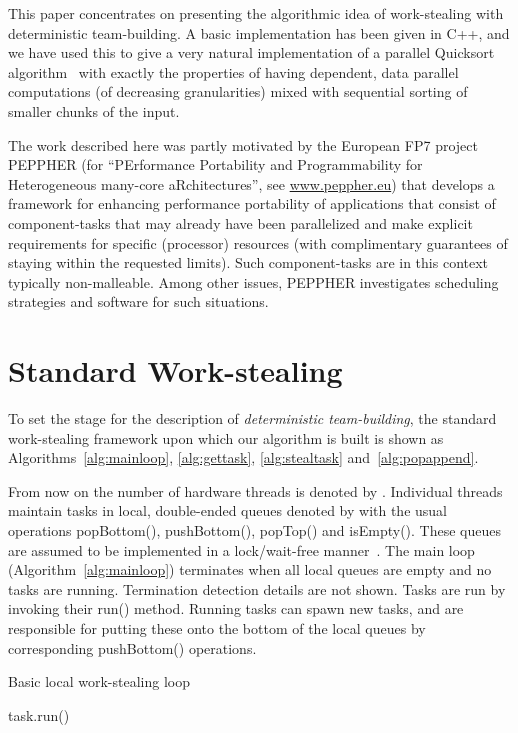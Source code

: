 \documentclass[preprint]{sigplanconf}
\begin{document}
This paper concentrates on presenting the algorithmic idea of
work-stealing with deterministic team-building. A basic implementation
has been given in C++, and we have used this to give a very natural
implementation of a parallel Quicksort
algorithm~\cite{TsigasZhang03} with exactly the properties of having
dependent, data parallel computations (of decreasing granularities)
mixed with sequential sorting of smaller chunks of the input.

The work described here was partly motivated by the European FP7
project PEPPHER (for ``PErformance Portability and Programmability for
Heterogeneous many-core aRchitectures'', see \url{www.peppher.eu})
that develops a framework for enhancing performance portability of
applications that consist of component-tasks that may already have
been parallelized and make explicit requirements for specific
(processor) resources (with complimentary guarantees of staying within
the requested limits). Such component-tasks are in this context typically
non-malleable. Among other issues, PEPPHER investigates scheduling
strategies and software for such situations.

\section{Standard Work-stealing}

To set the stage for the description of \emph{deterministic team-building}, 
the standard work-stealing framework upon which our algorithm is built is
shown as Algorithms~\ref{alg:mainloop}, \ref{alg:gettask}, \ref{alg:stealtask}
and~\ref{alg:popappend}.

From now on the number of hardware threads is denoted by .
Individual threads maintain tasks in local, double-ended queues
denoted by  with the usual operations popBottom(), pushBottom(),
popTop() and isEmpty(). These queues are assumed to be implemented in
a lock/wait-free
manner~\cite{AroraBlumofePlaxton01,HerlihyShavit08}. The main loop
(Algorithm~\ref{alg:mainloop}) terminates when all local queues are
empty and no tasks are running. Termination detection details are not
shown. Tasks are run by invoking their run() method.  Running tasks
can spawn new tasks, and are responsible for putting these onto the bottom of
the local queues by corresponding pushBottom() operations.

\begin{algorithm}
\begin{algorithmic}[1]
\caption{Basic local work-stealing loop}\label{alg:mainloop}
\STATE{}
	\STATE task.run()
\ENDWHILE
\end{algorithmic}
\end{algorithm}
\end{document}
